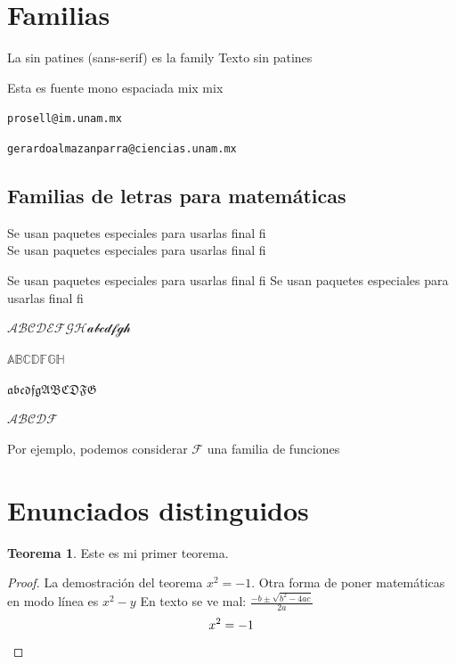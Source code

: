 \documentclass[10pt]{book}
\theoremstyle{definition}
\theoremstyle{theorem}
\newtheorem{teo}[defi]{Teorema}
\theoremstyle{remark}
\begin{document}
\section{Familias}\label{sec:familias}

La \textsf{sin patines} (sans-serif) es la family 
{\sffamily Texto sin patines}

{\ttfamily Esta es fuente mono espaciada mix} mix

\texttt{prosell@im.unam.mx}

\texttt{gerardoalmazanparra@ciencias.unam.mx}


\subsection{Familias de letras para matemáticas}

Se usan paquetes especiales para usarlas final f{i}\\
Se usan paquetes especiales para usarlas final f{i}

\medskip

Se usan paquetes especiales para usarlas final f{i}
Se usan paquetes especiales para usarlas final f{i}



$\mathcal{ABCDEFGH abcdfgh}$ %

$\mathbb{ABCDFGH}$ %

$\mathfrak{abcdfg ABCDFG}$ %

$\mathscr{ABCDF}$ %

Por ejemplo, podemos considerar $\mathcal{F}$ una familia de funciones

\section{Enunciados distinguidos}

\begin{teo}
    Este es mi primer teorema.
\end{teo}
\begin{proof}
    La demostración del teorema $x^2=-1$. Otra forma de poner matemáticas en modo línea es \(x^2-y\) En texto se ve mal: $\frac{-b\pm\sqrt{b^2-4ac}}{2a}$
    \begin{equation*}
        x^2=-1 \qedhere
    \end{equation*}
\end{proof}
\end{document}
